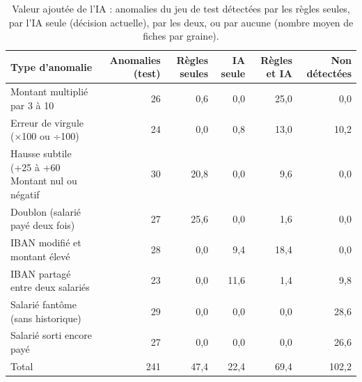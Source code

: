 \begin{table}[htbp]
\centering
\caption{Valeur ajoutée de l'IA : anomalies du jeu de test détectées par les règles seules, par l'IA seule (décision actuelle), par les deux, ou par aucune (nombre moyen de fiches par graine).}
\label{tab:valeur_ajoutee_ia}
\small
\begin{tabular}{lrrrrr}
\toprule
\textbf{Type d'anomalie} & \textbf{Anomalies (test)} & \textbf{Règles seules} & \textbf{IA seule} & \textbf{Règles et IA} & \textbf{Non détectées} \\
\midrule
Montant multiplié par 3 à 10 & 26 & 0,6 & 0,0 & 25,0 & 0,0 \\
Erreur de virgule (×100 ou ÷100) & 24 & 0,0 & 0,8 & 13,0 & 10,2 \\
Hausse subtile (+25 à +60 %
Montant nul ou négatif & 30 & 20,8 & 0,0 & 9,6 & 0,0 \\
Doublon (salarié payé deux fois) & 27 & 25,6 & 0,0 & 1,6 & 0,0 \\
IBAN modifié et montant élevé & 28 & 0,0 & 9,4 & 18,4 & 0,0 \\
IBAN partagé entre deux salariés & 23 & 0,0 & 11,6 & 1,4 & 9,8 \\
Salarié fantôme (sans historique) & 29 & 0,0 & 0,0 & 0,0 & 28,6 \\
Salarié sorti encore payé & 27 & 0,0 & 0,0 & 0,0 & 26,6 \\
Total & 241 & 47,4 & 22,4 & 69,4 & 102,2 \\
\bottomrule
\end{tabular}
\end{table}
